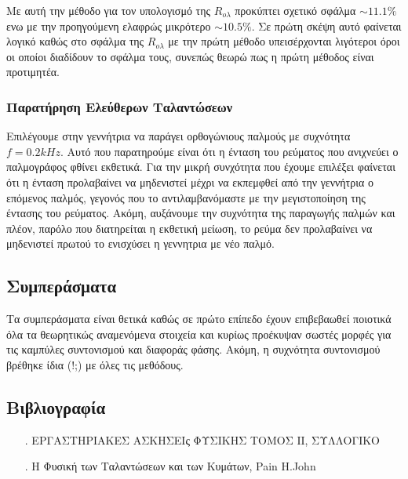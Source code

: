 \documentclass[a4paper]{article}
\begin{document}
Με αυτή την μέθοδο για τον υπολογισμό της $R_{ολ}$ προκύπτει σχετικό σφάλμα $\sim 11.1\%$ ενω με την προηγούμενη ελαφρώς μικρότερο $\sim 10.5\%$. Σε πρώτη σκέψη αυτό φαίνεται λογικό καθώς στο σφάλμα της $R_{ολ}$ με την πρώτη μέθοδο υπεισέρχονται λιγότεροι όροι οι οποίοι διαδίδουν το σφάλμα τους, συνεπώς θεωρώ πως η πρώτη μέθοδος είναι προτιμητέα.

\subsubsection*{Παρατήρηση Ελεύθερων Ταλαντώσεων}

Επιλέγουμε στην γεννήτρια να παράγει ορθογώνιους παλμούς με συχνότητα $f=0.2kHz$. Αυτό που παρατηρούμε είναι ότι η ένταση του ρεύματος που ανιχνεύει ο παλμογράφος φθίνει εκθετικά. Για την μικρή συνχότητα που έχουμε επιλέξει φαίνεται ότι η ένταση προλαβαίνει να μηδενιστεί μέχρι να εκπεμφθεί από την γεννήτρια ο επόμενος παλμός, γεγονός που το αντιλαμβανόμαστε με την μεγιστοποίηση της έντασης  του ρεύματος. Ακόμη, αυξάνουμε την συχνότητα της παραγωγής παλμών και πλέον, παρόλο που διατηρείται η εκθετική μείωση, το ρεύμα δεν προλαβαίνει να μηδενιστεί πρωτού το ενισχύσει η γεννητρια με νέο παλμό.

\subsection*{Συμπεράσματα}

Τα συμπεράσματα είναι θετικά καθώς σε πρώτο επίπεδο έχουν επιβεβαωθεί ποιοτικά όλα τα θεωρητικώς αναμενόμενα στοιχεία και κυρίως προέκυψαν σωστές μορφές για τις καμπύλες συντονισμού και διαφοράς φάσης. Ακόμη, η συχνότητα συντονισμού βρέθηκε ίδια (!;) με όλες τις μεθόδους. 

\subsection*{Βιβλιογραφία}
\begin{itemize}
\item[.] ΕΡΓΑΣΤΗΡΙΑΚΕΣ ΑΣΚΗΣΕΙς ΦΥΣΙΚΗΣ ΤΟΜΟΣ ΙΙ, ΣΥΛΛΟΓΙΚΟ
\item[.]  Η Φυσική των Ταλαντώσεων και των Κυμάτων, Pain H.John
\end{itemize}
\end{document}
